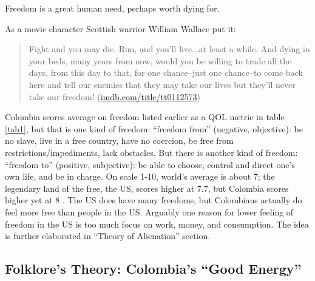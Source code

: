 \documentclass[10pt, letterpaper]{article}
\begin{document}
\begin{spacing}{2}
Freedom is a great human need, perhaps worth dying for.{
As a movie character Scottish warrior William Wallace put it:
\begin{quote}
  Fight and you may die. Run, and you'll live...at least a while. And dying in
  your beds, many years from now, would you be willing to trade all the days,
  from this day to that, for one chance--just one chance--to come back here and
  tell our enemies that they may take our lives but they'll never take our
  freedom! (\url{imdb.com/title/tt0112573})
\end{quote}
}
 Colombia scores average on freedom listed earlier as a QOL metric in table
\ref{tab1}, but that is one kind of freedom: ``freedom from''
(negative, objective): be no slave, live in a free country,  have no coercion, be free from restrictions/impediments, lack obstacles.
 But there is another kind of freedom: 
 ``freedom to'' (positive, subjective):  be able to choose,  control and direct one's own
 life, and be in charge.
  On scale 1-10, world's average is about 7; the legendary land of the free, the
  US, scores higher at 7.7, but Colombia scores higher yet at 8
  \citep{aok_free_from_to,ee_ls15}. The US does have many freedoms, but
  Colombians %
  actually do feel more free than people in the US. 
 Arguably one reason for lower feeling of freedom in the US is too much
 focus on work, money, and consumption. The idea is further elaborated in
 ``Theory of Alienation'' section.










\subsection{Folklore's Theory: Colombia's ``Good Energy''
}


\end{spacing}
\end{document}
